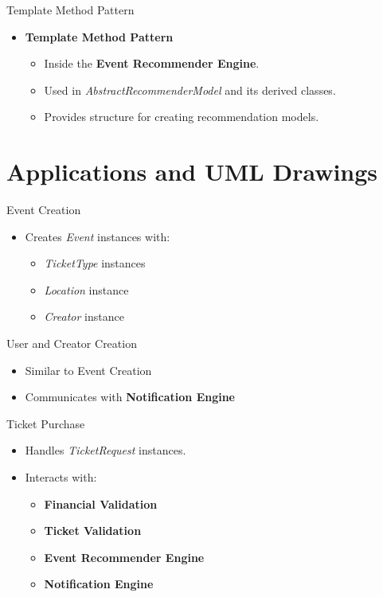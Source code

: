 \documentclass{beamer}
\begin{document}
\begin{frame}{Template Method Pattern}
    \begin{itemize}
        \item \textbf{Template Method Pattern}
        \begin{itemize}
            \item Inside the \textbf{Event Recommender Engine}.
            \item Used in \textit{AbstractRecommenderModel} and its derived classes.
            \item Provides structure for creating recommendation models.
        \end{itemize}
    \end{itemize}
\end{frame}

\section{Applications and UML Drawings}
\begin{frame}{Event Creation}
    \begin{itemize}
        \item Creates \textit{Event} instances with:
        \begin{itemize}
            \item \textit{TicketType} instances
            \item \textit{Location} instance
            \item \textit{Creator} instance
        \end{itemize}
    \end{itemize}
\end{frame}

\begin{frame}{User and Creator Creation}
    \begin{itemize}
        \item Similar to Event Creation
        \item Communicates with \textbf{Notification Engine}
    \end{itemize}
\end{frame}

\begin{frame}{Ticket Purchase}
    \begin{itemize}
        \item Handles \textit{TicketRequest} instances.
        \item Interacts with:
        \begin{itemize}
            \item \textbf{Financial Validation}
            \item \textbf{Ticket Validation}
            \item \textbf{Event Recommender Engine}
            \item \textbf{Notification Engine}
        \end{itemize}
    \end{itemize}
\end{frame}
\end{document}
